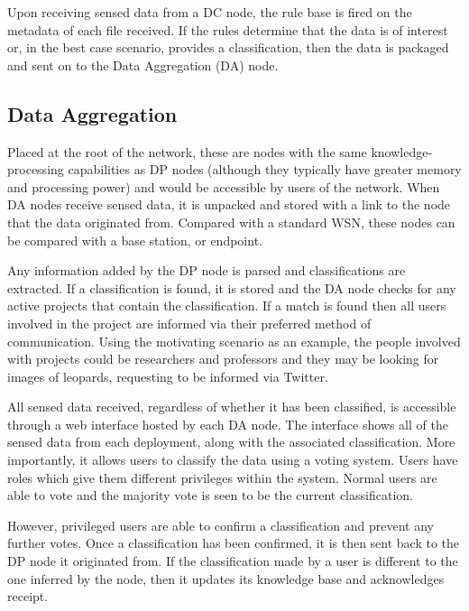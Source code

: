 	
	Upon receiving sensed data from a DC node, the rule base is fired on the metadata of each file received. If the rules determine that the data is of interest or, in the best case scenario, provides a classification, then the data is packaged and sent on to the Data Aggregation (DA) node.
	
	\subsection{Data Aggregation}
	Placed at the root of the network, these are nodes with the same knowledge-processing capabilities as DP nodes (although they typically have greater memory and processing power) and would be accessible by users of the network. When DA nodes receive sensed data, it is unpacked and stored with a link to the node that the data originated from. Compared with a standard WSN, these nodes can be compared with a base station, or endpoint.
	
	Any information added by the DP node is parsed and classifications are extracted. If a classification is found, it is stored and the DA node checks for any active projects that contain the classification. If a match is found then all users involved in the project are informed via their preferred method of communication. Using the motivating scenario as an example, the people involved with projects could be researchers and professors and they may be looking for images of leopards, requesting to be informed via Twitter.
	
	All sensed data received, regardless of whether it has been classified, is accessible through a web interface hosted by each DA node. The interface shows all of the sensed data from each deployment, along with the associated classification. More importantly, it allows users to classify the data using a voting system. Users have roles which give them different privileges within the system. Normal users are able to vote and the majority vote is seen to be the current classification.
	
	However, privileged users are able to confirm a classification and prevent any further votes. Once a classification has been confirmed, it is then sent back to the DP node it originated from. If the classification made by a user is different to the one inferred by the node, then it updates its knowledge base and acknowledges receipt.

